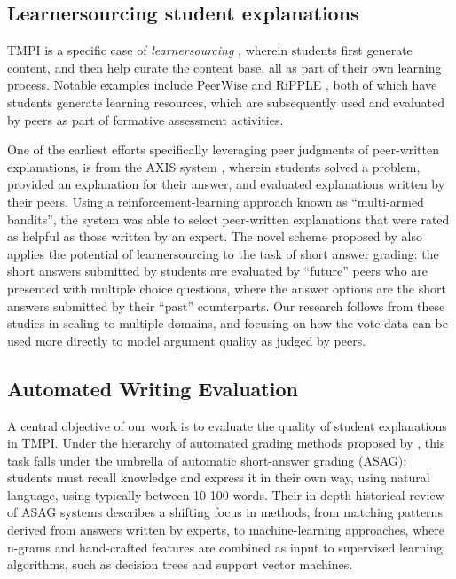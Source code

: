 \documentclass[notitlepage,12pt]{jedm}
\begin{document}
\subsection{Learnersourcing student explanations}
TMPI is a specific case of  \textit{learnersourcing} 
\cite{weir_learnersourcing_2015}, wherein students first generate content, and 
then help curate the content base, all as part of their own learning process.
Notable examples include PeerWise \cite{denny_peerwise:_2008} and RiPPLE 
\cite{khosravi_ripple_2019}, both of which have students generate learning 
resources, which are subsequently used and evaluated by peers as part of 
formative assessment activities.

One of the earliest efforts specifically leveraging peer judgments of 
peer-written explanations, is from the AXIS system \cite{williams_axis:_2016}, 
wherein students solved a problem, provided an explanation for their answer, 
and evaluated explanations written by their peers.
Using a reinforcement-learning approach known as ``multi-armed bandits'', the 
system was able to select peer-written explanations that were rated as helpful 
as those written by an expert.
The novel scheme proposed by \cite{kolhe_peer_2016} also applies the potential 
of learnersourcing to the task of short answer grading: the short answers 
submitted by students are evaluated by ``future'' peers who are presented with 
multiple choice questions, where the answer options are the short answers 
submitted by their ``past'' counterparts.
Our research follows from these studies in scaling to multiple domains, and 
focusing on how the vote data can be used more directly to model argument 
quality as judged by peers.



\subsection{Automated Writing Evaluation}

A central objective of our work is to evaluate the quality of student 
explanations in TMPI.
Under the hierarchy of automated grading methods proposed by  
\cite{burrows_eras_2015}, this task falls under the umbrella of automatic 
short-answer grading (ASAG); students must recall knowledge and express it 
in their own way, using natural language, using typically between 10-100 words. 
Their in-depth historical review of ASAG systems describes a shifting focus in 
methods, from matching patterns derived from answers written by experts, to 
machine-learning approaches, where n-grams and hand-crafted features are 
combined as input to supervised learning algorithms, such as decision trees and 
support vector machines.
\end{document}
